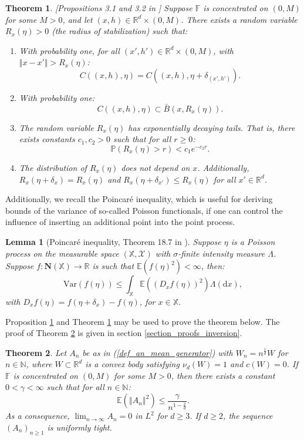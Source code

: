 \documentclass{article}
\newcommand{\NN}{\mathbb{N}}
\newcommand{\RR}{\mathbb{R}}
\newcommand{\PP}{\mathbb{P}}
\newcommand{\EE}{\mathbb{E}}
\theoremstyle{plain}
\newtheorem{theorem}{Theorem}
\newtheorem{lemma}{Lemma}
\theoremstyle{remark}
\theoremstyle{definition}
\begin{document}
\begin{theorem}\label{stabilization_theorem}[Propositions 3.1 and 3.2 in \cite{Flimmel2020}]
    Suppose $\mathbb{F}$ is concentrated on $(0,M)$ for some $M > 0$, and let $(x,h) \in \RR^d \times (0,M)$. There exists a random variable $R_x(\eta) > 0$ (the radius of stabilization) such that:
    \begin{enumerate}
        \item With probability one, for all $(x',h') \in \RR^d \times (0,M)$, with $\Vert x - x'\Vert > R_x(\eta)$:
        \[C((x,h),\eta) = C\left((x,h),\eta+\delta_{(x',h')}\right).\]
        \item With probability one:
        \[C((x,h),\eta) \subset \bar{B}(x,R_x(\eta)).\]
        \item The random variable $R_x(\eta)$ has exponentially decaying tails. That is, there exists constants $c_1,c_2 > 0$ such that for all $r \geq 0$:
        \[\PP(R_x(\eta) > r)<c_1e^{-c_2r}.\]
        \item The distribution of $R_x(\eta)$ does not depend on $x$. Additionally, $R_x(\eta+\delta_x) = R_x(\eta)$ and $R_x(\eta+\delta_{x'}) \leq R_x(\eta)$ for all $x' \in \RR^d$.
    \end{enumerate}
\end{theorem}

Additionally, we recall the Poincar\'e inequality, which is useful for deriving bounds of the variance of so-called Poisson functionals, if one can control the influence of inserting an additional point into the point process.

\begin{lemma}[Poincar\'e inequality, Theorem 18.7 in \cite{Last2018}]\label{poincare_inequality_lemma}
    Suppose $\eta$ is a Poisson process on the measurable space $(\mathbb{X},\mathcal{X})$ with $\sigma$-finite intensity measure $\Lambda$. Suppose $f:\mathbf{N}(\mathbb{X}) \to \RR$ is such that $\EE(f(\eta)^2)<\infty$, then:
    \[\mathrm{Var}(f(\eta)) \leq \int_\mathbb{X}\EE\left((D_x f(\eta))^2\right)\Lambda(\mathrm{d}x),\]
    with $D_xf(\eta) = f(\eta+\delta_x)-f(\eta)$, for $x \in \mathbb{X}$.
\end{lemma}

Proposition \ref{poincare_inequality_lemma} and Theorem \ref{stabilization_theorem} may be used to prove the theorem below. The proof of Theorem \ref{thm_an_L2_bound} is given in section \ref{section_proofs_inversion}.

\begin{theorem}\label{thm_an_L2_bound}
    Let $A_n$ be as in (\ref{def_an_mean_generator}) with $W_n = n^\frac{1}{d}W$ for $n \in \NN$, where $W \subset \RR^d$ is a convex body satisfying $\nu_d(W) = 1$ and $c(W) = 0$. If $\mathbb{F}$ is concentrated on $(0,M)$ for some $M > 0$, then there exists a constant $0 < \gamma < \infty$ such that for all $n \in \NN$:
    \[\EE\left( \left\Vert A_n \right\Vert^2 \right) \leq \frac{\gamma}{n^{1-\frac{2}{d}}}.\]
    As a consequence, $\lim_{n \to \infty} A_n = 0$ in $L^2$ for $d \geq 3$. If $d\geq 2$, the sequence $(A_n)_{n\geq 1}$ is uniformly tight.
\end{theorem}
\end{document}

